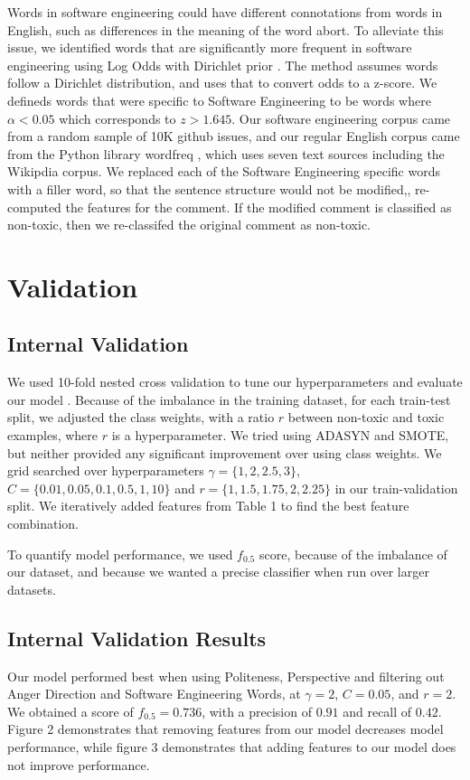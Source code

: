 \documentclass[conference]{IEEEtran}
\begin{document}
Words in software engineering could have different connotations from words in English, such as differences in the meaning of the word abort. To alleviate this issue, we identified words that are significantly more frequent in software engineering using Log Odds with Dirichlet prior \cite{monroe2008fightin}. The method assumes words follow a Dirichlet distribution, and uses that to convert odds to a z-score. We defineds words that were specific to Software Engineering to be words where $\alpha<0.05$ which corresponds to $z>1.645$. Our software engineering corpus came from a random sample of 10K github issues, and our regular English corpus came from the Python library wordfreq \cite{speer2016wordfreq}, which uses seven text sources including the Wikipdia corpus. We replaced each of the Software Engineering specific words with a filler word, so that the sentence structure would not be modified,, re-computed the features for the comment. If the modified comment is classified as non-toxic, then we re-classifed the original comment as non-toxic. 
\section{Validation} 
\subsection{Internal Validation} 
We used 10-fold nested cross validation to tune our hyperparameters and evaluate our model \cite{fearn2010double}. Because of the imbalance in the training dataset, for each train-test split, we adjusted the class weights, with a ratio $r$ between non-toxic and toxic examples, where $r$ is a hyperparameter. We tried using ADASYN and SMOTE, but neither provided any significant improvement over using class weights. We grid searched over hyperparameters $\gamma=\{1,2,2.5,3\}$, $C=\{0.01,0.05,0.1,0.5,1,10\}$ and $r=\{1,1.5,1.75,2,2.25\}$ in our train-validation split. We iteratively added features from Table 1 to find the best feature combination.

To quantify model performance, we used $f_{0.5}$ score, because of the imbalance of our dataset, and because we wanted a precise classifier when run over larger datasets. 

\subsection{Internal Validation Results} 

Our model performed best when using Politeness, Perspective and filtering out Anger Direction and Software Engineering Words, at $\gamma=2$, $C=0.05$, and $r=2$. We obtained a score of $f_{0.5}=0.736$, with a precision of $0.91$ and recall of $0.42$. Figure 2 demonstrates that removing features from our model decreases model performance, while figure 3 demonstrates that adding features to our model does not improve performance.  
\end{document}
